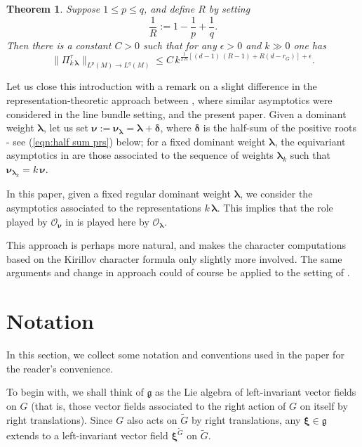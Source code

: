 \documentclass[12pt,a4paper]{article}
\theoremstyle{plain}
\newtheorem{thm}{Theorem}[section]
\theoremstyle{definition}
\begin{document}
\begin{thm}
\label{thm:operator norm norm estimate}
Suppose $1\le p\le q$, and define $R$ by setting
$$
\frac{1}{R}:=1-\frac{1}{p}+\frac{1}{q}.
$$ 
Then there is a constant
$C>0$ such that for any $\epsilon>0$ and
$k\gg 0$ one has
$$
\|\Pi^{\tau}_{k\,\boldsymbol{\lambda}}\|_{L^p(M)\rightarrow L^q(M)}\le C\,
k^{\frac{1}{2\,R}\left[ (d-1)\,\left( R-1  \right)
+R(d-r_G)\right]+\epsilon}.
$$


\end{thm}

Let us close this introduction with a remark 
on a slight difference in the representation-theoretic
approach
between \cite{p22}, where similar asymptotics
were considered in the line bundle setting, 
and the present paper.
Given 
a dominant weight 
$\boldsymbol{\lambda}$, let us set 
$\boldsymbol{\nu}:=\boldsymbol{\nu}_{\boldsymbol{\lambda}}=\boldsymbol{\lambda}+\boldsymbol{\delta}$,
where $\boldsymbol{\delta}$ is the half-sum of the positive roots
- see (\ref{eqn:half sum prs}) below;
for a fixed dominant weight $\boldsymbol{\lambda}$, the 
equivariant asymptotics in \cite{p22} are those associated to
the sequence of weights $\boldsymbol{\lambda}_k$ such that
$\boldsymbol{\nu}_{\boldsymbol{\lambda}_k}=k\,\boldsymbol{\nu}$. 

In this paper, given a fixed regular dominant weight
$\boldsymbol{\lambda}$, we consider the asymptotics
associated to the representations $k\,\boldsymbol{\lambda}$.
This implies that the role played by 
$\mathcal{O}_{\boldsymbol{\nu}}$ in \cite{p22} is played here by
$\mathcal{O}_{\boldsymbol{\lambda}}$.

This approach is perhaps more natural, and makes the
character computations based on the Kirillov character formula
only slightly more involved. The same arguments and change in
approach could of course be applied to the setting of
\cite{p22}.  





\section{Notation}


In this section, we collect some notation and conventions 
used in the paper for the
reader's convenience. 

To begin with, we shall think of $\mathfrak{g}$ as the Lie algebra of left-invariant vector fields on $G$ (that is, those vector fields associated to
the right action of $G$ on itself by right translations).
%
Since $G$ also acts on $\tilde{G}$ by right translations, any $\boldsymbol{\xi}\in \mathfrak{g}$ extends to
a left-invariant vector field $\boldsymbol{\xi
}^{\tilde{G}}$
on $\tilde{G}$. 
\end{document}
